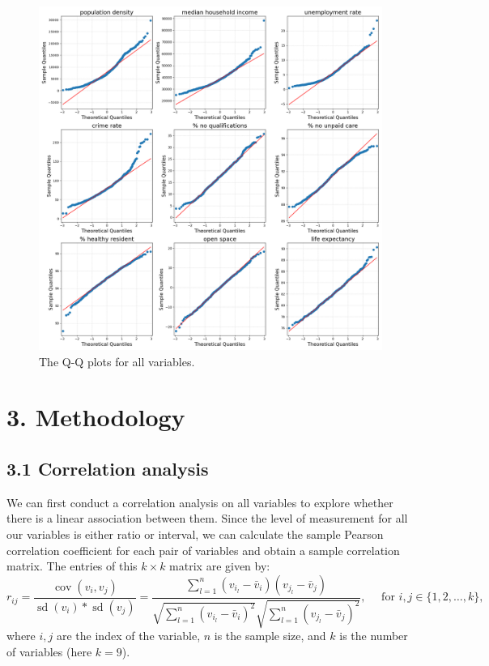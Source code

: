 \documentclass[a4paper,12pt]{article}
\begin{document}
\begin{figure}\begin{center}
\includegraphics[width=0.55\columnwidth]{qm_22.png}
\end{center}
\caption[]{
The Q-Q plots for all variables.
}
\label{fig: 2.2}
\end{figure}





\section*{3. Methodology}

\subsection*{3.1 Correlation analysis}
We can first conduct a correlation analysis on all variables to explore whether there is a linear association between them. Since the level of measurement for all our variables is either ratio or interval, we can calculate the sample Pearson correlation coefficient for each pair of variables and obtain a sample correlation matrix. The entries of this $k \times k$ matrix are given by:
\begin{equation*}
r_{i j}=\frac{\operatorname{cov}\left(v_i, v_j\right)}{\operatorname{sd}\left(v_i\right) * \operatorname{sd}\left(v_j\right)}=\frac{\sum_{l=1}^n\left(v_{i_l}-\bar{v}_i\right)\left(v_{j_l}-\bar{v}_j\right)}{\sqrt{\sum_{l=1}^n\left(v_{i_l}-\bar{v}_i\right)^2} \sqrt{\sum_{l=1}^n\left(v_{j_l}-\bar{v}_j\right)^2}}, \quad \text { for } i, j \in\{1,2, \ldots, k\},
\end{equation*}
where $i, j$ are the index of the variable, $n$ is the sample size, and $k$ is the number of variables (here $k=9$).
\end{document}
